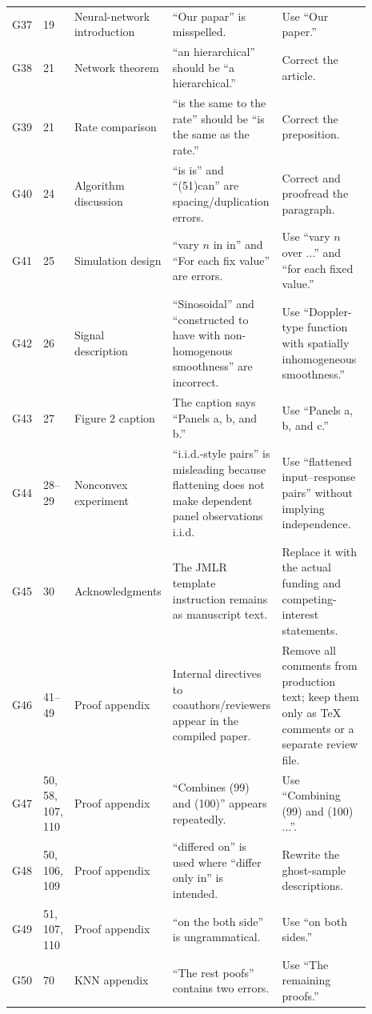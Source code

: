 \documentclass[11pt]{article}
\begin{document}
\begin{landscape}
\begin{longtable}{L{0.045\linewidth}L{0.065\linewidth}L{0.16\linewidth}L{0.31\linewidth}L{0.31\linewidth}}
G37 & 19 & Neural-network introduction & “Our papar” is misspelled. & Use “Our paper.”\\
G38 & 21 & Network theorem & “an hierarchical” should be “a hierarchical.” & Correct the article.\\
G39 & 21 & Rate comparison & “is the same to the rate” should be “is the same as the rate.” & Correct the preposition.\\
G40 & 24 & Algorithm discussion & “is is” and “(51)can” are spacing/duplication errors. & Correct and proofread the paragraph.\\
G41 & 25 & Simulation design & “vary $n$ in in” and “For each fix value” are errors. & Use “vary $n$ over ...” and “for each fixed value.”\\
G42 & 26 & Signal description & “Sinosoidal” and “constructed to have with non-homogenous smoothness” are incorrect. & Use “Doppler-type function with spatially inhomogeneous smoothness.”\\
G43 & 27 & Figure 2 caption & The caption says “Panels a, b, and b.” & Use “Panels a, b, and c.”\\
G44 & 28--29 & Nonconvex experiment & “i.i.d.-style pairs” is misleading because flattening does not make dependent panel observations i.i.d. & Use “flattened input--response pairs” without implying independence.\\
G45 & 30 & Acknowledgments & The JMLR template instruction remains as manuscript text. & Replace it with the actual funding and competing-interest statements.\\
G46 & 41--49 & Proof appendix & Internal directives to coauthors/reviewers appear in the compiled paper. & Remove all comments from production text; keep them only as TeX comments or a separate review file.\\
G47 & 50, 58, 107, 110 & Proof appendix & “Combines (99) and (100)” appears repeatedly. & Use “Combining (99) and (100) ...”.\\
G48 & 50, 106, 109 & Proof appendix & “differed on” is used where “differ only in” is intended. & Rewrite the ghost-sample descriptions.\\
G49 & 51, 107, 110 & Proof appendix & “on the both side” is ungrammatical. & Use “on both sides.”\\
G50 & 70 & KNN appendix & “The rest poofs” contains two errors. & Use “The remaining proofs.”\\

\end{longtable}
\end{landscape}
\end{document}
